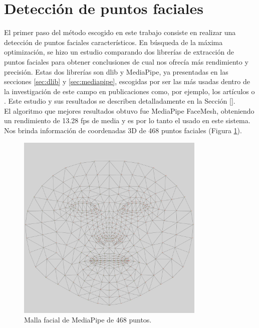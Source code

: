 \section{Detección de puntos faciales}
\label{sec:deteccion_de puntos}

El primer paso del método escogido en este trabajo consiste en realizar una detección de puntos faciales característicos. En búsqueda de la máxima optimización, se hizo un estudio comparando dos librerías de extracción de puntos faciales para obtener conclusiones de cual nos ofrecía más rendimiento y precisión. Estas dos librerías son dlib y MediaPipe, ya presentadas en las secciones \ref{sec:dlib} y \ref{sec:mediapipe}, escogidas por ser las más usadas dentro de la investigación de este campo en publicaciones como, por ejemplo, los artículos \cite{dlib_emotions} o \cite{mediapipe_emotions}. Este estudio y sus resultados se describen detalladamente en la Sección \ref{}.\\

El algoritmo que mejores resultados obtuvo fue MediaPipe FaceMesh, obteniendo un rendimiento de 13.28 fps de media y es por lo tanto el usado en este sistema. Nos brinda información de coordenadas 3D de 468 puntos faciales (Figura \ref{fig:mediapipe_malla}).\\

\begin{figure} [h!]
  \begin{center}
    \includegraphics[width=9cm]{figs/canonical_face_model_uv_visualization.png}
  \end{center}
  \captionsetup{justification=centering}
  \caption{Malla facial de MediaPipe de 468 puntos.}
  \label{fig:mediapipe_malla}
\end{figure}

